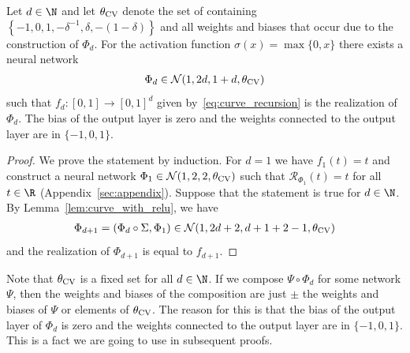 \documentclass{amsart}[11pt]
\numberwithin{equation}{section}
\newcommand{\nn}{\mathcal{N}}
\newcommand{\realization}{\mathcal{R}}
\numberwithin{theorem}{section}
\begin{document}
\begin{lemma}\label{lem:orthant_visiting_curve}
    Let $d \in \N$ and let $\theta_{\rm CV}$ denote the set of containing $\left\{-1, 0, 1, -\delta^{-1}, \delta, -(1 - \delta)\right\}$ and all weights and biases that occur due to the construction of $\Phi_d$. For the activation function $\sigma(x) = \max\{0, x\}$ there exists a neural network 
    \begin{align*}
        \Phi_d \in \nn(1, 2d, 1 + d, \theta_{\rm CV})
    \end{align*}
    such that $f_d: [0, 1] \to [0, 1]^d$ given by~\eqref{eq:curve_recursion} is the realization of $\Phi_d$. The bias of the output layer is zero and the weights connected to the output layer are in $\{-1, 0, 1\}$. 
\end{lemma}
\begin{proof}
    We prove the statement by induction. For $d = 1$ we have $f_1(t) = t$ and construct a neural network $\Phi_1 \in \nn(1, 2, 2, \theta_{\rm CV})$ such that $\realization_{\Phi_1}(t) = t$ for all $t \in \R$ (Appendix~\ref{sec:appendix}).
    Suppose that the statement is true for $d \in \N$. By Lemma~\ref{lem:curve_with_relu}, we have
    \begin{align*}
        \Phi_{d + 1} = (\Phi_d \circ \Sigma, \Phi_1) \in \nn(1, 2d + 2, d + 1 + 2 - 1, \theta_{\rm CV})
    \end{align*}
    and the realization of $\Phi_{d + 1}$ is equal to $f_{d + 1}$.
\end{proof}

Note that $\theta_{\rm CV}$ is a fixed set for all $d \in \N$. If we compose $\Psi \circ \Phi_d$ for some network $\Psi$, then the weights and biases of the composition are just $\pm$ the weights and biases of $\Psi$ or elements of $\theta_{\rm CV}$. The reason for this is that the bias of the output layer of $\Phi_d$ is zero and the weights connected to the output layer are in $\{-1, 0, 1\}$. This is a fact we are going to use in subsequent proofs.
\end{document}
